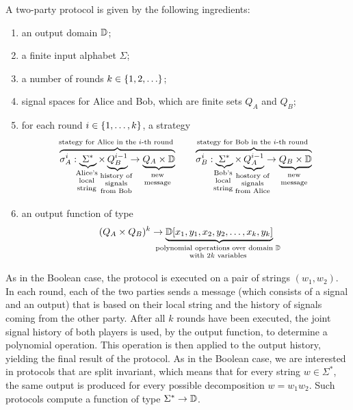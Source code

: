 \begin{definition}\label{def:two-party-protocol-general} A two-party protocol   
   is given by the following ingredients: 
  \begin{enumerate}
    \item an output domain $\mathbb D$;
    \item a finite input alphabet $\Sigma$;
    \item a number of rounds $k \in \{1,2,\ldots\}$;
    \item signal spaces for Alice and Bob, which are finite sets $Q_A$ and $Q_B$;
    \item for each round $i \in \{1,\ldots,k\}$, a strategy
    \begin{align*}
    \myoverbrace{\sigma_A^i : \myunderbrace{\Sigma^*}{Alice's \\ local\\ string} \times \myunderbrace{Q_B^{i-1}}{history of \\ signals \\ from Bob}  \to \myunderbrace{Q_A \times \domain}{new\\ message}}{stategy for Alice in the $i$-th round}
    \qquad 
        \myoverbrace{\sigma_B^i : \myunderbrace{\Sigma^*}{Bob's \\ local\\ string} \times \myunderbrace{Q_A^{i-1}}{hostory of \\ signals \\ from Alice}  \to \myunderbrace{Q_B \times \domain}{new\\ message}}{stategy for Bob in the $i$-th round}
    \end{align*}
    \item an output function of type \begin{align*}
    (Q_A \times Q_B)^{k} \to \myunderbrace{\domain[x_1,y_1,x_2,y_2,\ldots,x_k,y_k]}{polynomial operations  over domain $\domain$ \\ with $2k$ variables}
    \end{align*}
  \end{enumerate}
\end{definition}

As in the Boolean case, the protocol is executed on a pair of strings $(w_1,w_2)$. In each round, each of the two parties  sends a message (which consists of a signal and an output) that is based on their local string and the history of signals coming from the other party. After all $k$ rounds have been executed, the joint signal history of both players is used, by the output function, to determine a polynomial operation. This operation is then applied to the output history, yielding the final result of the protocol. As in the Boolean case, we are interested in protocols that are split invariant, which means that for every string $w \in \Sigma^*$, the same output is produced for every possible decomposition $w = w_1 w_2$. Such protocols compute a function of type $\Sigma^* \to \mathbb D$. 

